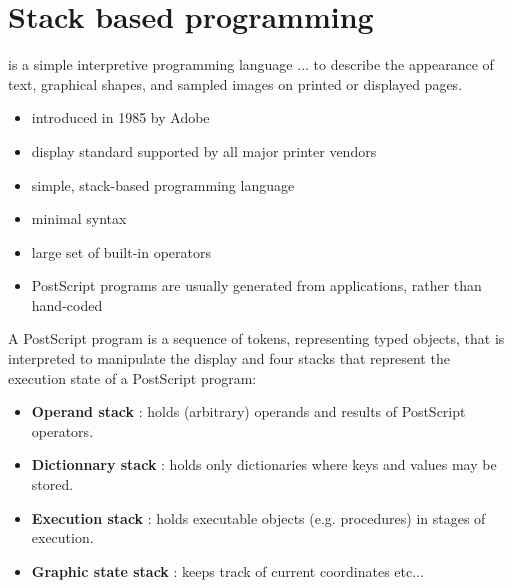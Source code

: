 \documentclass[a4paper,11pt]{article}
\begin{document}
\section{Stack based programming}

\begin{tcolorbox}[title=What is PostScript ?]
  is a simple interpretive programming language ... to describe the appearance
  of text, graphical shapes, and sampled images on printed or displayed pages.

  \begin{itemize}
  \item introduced in 1985 by Adobe
  \item display standard supported by all major printer vendors
  \item simple, stack-based programming language
  \item minimal syntax
  \item large set of built-in operators
  \item PostScript programs are usually generated from applications, rather than hand-coded
  \end{itemize}
\end{tcolorbox}

A PostScript program is a sequence of tokens, representing typed objects, that
is interpreted to manipulate the display and four stacks that represent the
execution state of a PostScript program:

\begin{itemize}
\item \textbf{Operand stack} : holds (arbitrary) operands and results of PostScript
  operators.
\item \textbf{Dictionnary stack} : holds only dictionaries where keys and values may be
  stored.
\item \textbf{Execution stack} : holds executable objects (e.g. procedures) in stages of
  execution.
\item \textbf{Graphic state stack} : keeps track of current coordinates etc...
\end{itemize}

\section{}

\section{}
\end{document}
